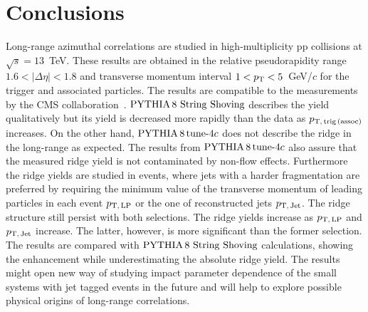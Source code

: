 
\section{Conclusions}
\label{sec:summary}
Long-range azimuthal correlations are studied in high-multiplicity pp collisions at $\sqrt{s} = 13$~TeV. These results are obtained in the relative pseudorapidity range $1.6 < |\Delta\eta| < 1.8$ and transverse momentum interval $1 < p_\mathrm{T} < 5$~GeV/$c$ for the trigger and associated particles. 
The results are compatible to the measurements by the CMS collaboration~\cite{Khachatryan:2015lva}.
${\mathrm{PYTHIA}\,8~\mathrm{String}~}\mathrm{Shoving}$ describes the yield qualitatively but its yield is decreased more rapidly than the data as $p_\mathrm{T,\,trig\,(assoc)}$ increases. On the other hand, $\mathrm{PYTHIA}\,8\,\mathrm{tune}{\text -}4c$ does not describe the ridge in the long-range as expected. The results from $\mathrm{PYTHIA}\,8\,\mathrm{tune}{\text -}4c$ also assure that the measured ridge yield is not contaminated by non-flow effects.
Furthermore the ridge yields are studied in events, where jets with a harder fragmentation are preferred by requiring the minimum value of the transverse momentum of leading particles in each event $p_\mathrm{T,\,LP}$ or the one of reconstructed jets $p_\mathrm{T,\,Jet}$. The ridge structure still persist with both selections. The ridge yields increase as $p_\mathrm{T,\,LP}$ and $p_\mathrm{T,\,Jet}$ increase. The latter, however, is more significant than the former selection. The results are compared with ${\mathrm{PYTHIA}\,8~\mathrm{String}~}\mathrm{Shoving}$ calculations, showing the enhancement while underestimating the absolute ridge yield.
The results might open new way of studying impact parameter dependence of the small systems with jet tagged events in the future and will help to explore possible physical origins of long-range correlations.